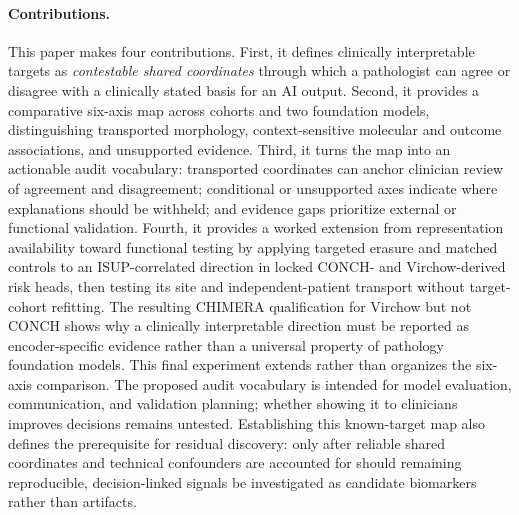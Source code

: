 \paragraph{Contributions.}
This paper makes four contributions. First, it defines clinically interpretable targets as
\emph{contestable shared coordinates} through which a pathologist can agree or disagree with
a clinically stated basis for an AI output. Second, it provides a comparative six-axis map
across cohorts and two foundation models, distinguishing transported morphology,
context-sensitive molecular and outcome associations, and unsupported evidence. Third, it
turns the map into an actionable audit vocabulary: transported coordinates can anchor
clinician review of agreement and disagreement; conditional or unsupported axes indicate
where explanations should be withheld; and evidence gaps prioritize external or functional
validation. Fourth, it provides a worked extension from representation availability toward
functional testing by applying targeted erasure and matched controls to an
ISUP-correlated direction in locked CONCH- and Virchow-derived risk heads, then testing its
site and independent-patient transport without target-cohort refitting. The resulting CHIMERA
qualification for Virchow but not CONCH shows why a clinically interpretable direction must be
reported as encoder-specific evidence rather than a universal property of pathology foundation
models. This final
experiment extends rather than organizes the six-axis comparison. The proposed audit
vocabulary is intended for model evaluation, communication, and validation planning; whether
showing it to clinicians improves decisions remains untested. Establishing this known-target
map also defines the prerequisite for residual discovery: only after reliable shared coordinates
and technical confounders are accounted for should remaining reproducible, decision-linked
signals be investigated as candidate biomarkers rather than artifacts.

